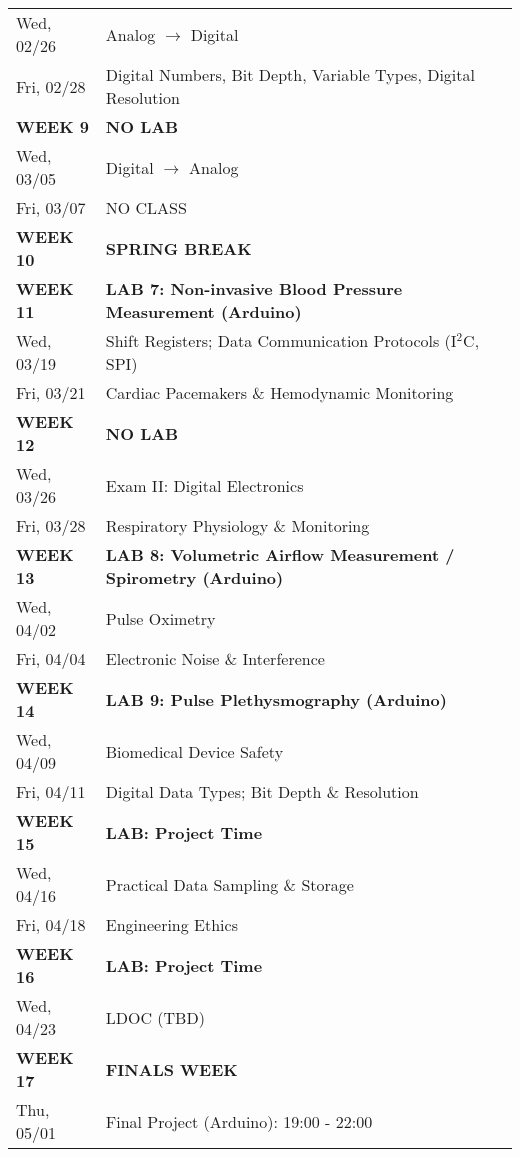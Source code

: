 \begin{tabular}{|l|l|}
Wed, 02/26  &   Analog $\rightarrow$ Digital \\ 
Fri, 02/28  &   Digital Numbers, Bit Depth, Variable Types, Digital Resolution \\ \hline
{\bf WEEK 9}      &   {\bf NO LAB} \\
Wed, 03/05  &   Digital $\rightarrow$ Analog \\ 
Fri, 03/07  &   NO CLASS \\ \hline
{\bf WEEK 10}     &   {\bf SPRING BREAK} \\ \hline
{\bf WEEK 11}     &   {\bf LAB 7: Non-invasive Blood Pressure Measurement (Arduino)} \\
Wed, 03/19  &   Shift Registers; Data Communication Protocols (I$^2$C, SPI)\\
Fri, 03/21  &   Cardiac Pacemakers \& Hemodynamic Monitoring \\ \hline
{\bf WEEK 12}     &   {\bf NO LAB} \\
Wed, 03/26  &   Exam II: Digital Electronics \\ 
Fri, 03/28  &   Respiratory Physiology \& Monitoring \\  \hline
{\bf WEEK 13}     &   {\bf LAB 8: Volumetric Airflow Measurement / Spirometry (Arduino)} \\
Wed, 04/02  &   Pulse Oximetry \\ 
Fri, 04/04  &   Electronic Noise \& Interference \\ \hline
{\bf WEEK 14}     &   {\bf LAB 9: Pulse Plethysmography (Arduino)} \\
Wed, 04/09  &   Biomedical Device Safety \\
Fri, 04/11  &   Digital Data Types; Bit Depth \& Resolution \\ \hline
{\bf WEEK 15}     &   {\bf LAB: Project Time} \\
Wed, 04/16  &   Practical Data Sampling \& Storage \\
Fri, 04/18  &   Engineering Ethics \\ \hline
{\bf WEEK 16}     &   {\bf LAB: Project Time} \\
Wed, 04/23  &   LDOC (TBD) \\ \hline
{\bf WEEK 17}     &   {\bf FINALS WEEK} \\
Thu, 05/01  &   Final Project (Arduino): 19:00 - 22:00 \\ \hline
\end{tabular}

